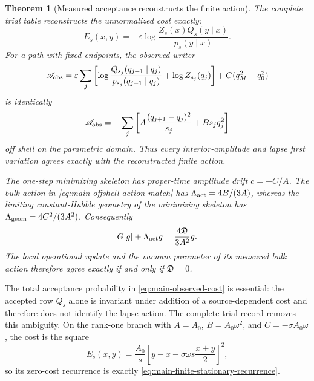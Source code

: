 \documentclass[11pt]{article}
\newtheorem{theorem}{Theorem}[section]
\numberwithin{equation}{section}
\theoremstyle{definition}
\theoremstyle{remark}
\begin{document}
\begin{theorem}[Measured acceptance reconstructs the finite action]
\label{thm:main-operational-action-matching}
The complete trial table reconstructs the unnormalized cost exactly:
\begin{equation}
 E_s(x,y)=-\varepsilon\log
 \frac{Z_s(x)Q_s(y\mid x)}{p_s(y\mid x)}.
 \label{eq:main-observed-cost}
\end{equation}
For a path with fixed endpoints, the observed writer
\begin{equation}
 \mathscr A_{\rm obs}
 =\varepsilon\sum_j\left[
 \log\frac{Q_{s_j}(q_{j+1}\mid q_j)}{p_{s_j}(q_{j+1}\mid q_j)}
 +\log Z_{s_j}(q_j)\right]
 +C(q_M^2-q_0^2)
 \label{eq:main-observed-homogeneous-action}
\end{equation}
is identically
\begin{equation}
 \mathscr A_{\rm obs}
 =-\sum_j\left[A\frac{(q_{j+1}-q_j)^2}{s_j}
 +Bs_j\bar q_j^2\right]
 \label{eq:main-offshell-action-match}
\end{equation}
off shell on the parametric domain.  Thus every interior-amplitude and lapse
first variation agrees exactly with the reconstructed finite action.

The one-step minimizing skeleton has proper-time amplitude drift
$c=-C/A$.  The bulk action in
\eqref{eq:main-offshell-action-match} has
$\Lambda_{\rm act}=4B/(3A)$, whereas the limiting constant-Hubble geometry of
the minimizing skeleton has
$\Lambda_{\rm geom}=4C^2/(3A^2)$.  Consequently
\begin{equation}
 G[g]+\Lambda_{\rm act}g
 =\frac{4\mathfrak D}{3A^2}g.
 \label{eq:main-measured-einstein-mismatch}
\end{equation}
The local operational update and the vacuum parameter of its measured bulk
action therefore agree exactly if and only if $\mathfrak D=0$.
\end{theorem}

The total acceptance probability in
\eqref{eq:main-observed-cost} is essential: the accepted row $Q_s$ alone is
invariant under addition of a source-dependent cost and therefore does not
identify the lapse action.  The complete trial record removes this ambiguity.
On the rank-one branch with $A=A_0$, $B=A_0\omega^2$, and
$C=-\sigma A_0\omega$, the cost is the square
\begin{equation}
 E_s(x,y)=\frac{A_0}{s}
 \left[y-x-\sigma\omega s\frac{x+y}{2}\right]^2,
 \label{eq:main-rank-one-cost}
\end{equation}
so its zero-cost recurrence is exactly
\eqref{eq:main-finite-stationary-recurrence}.
\end{document}
